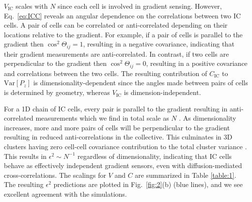 $V_\text{IC}$ scales with $N$ since each cell is involved in gradient sensing. However, Eq.\ \ref{eq:ICC} %
reveals an angular dependence on the correlations between two IC cells. A pair of cells can be correlated or anti-correlated depending on their locations relative to the gradient. For example, if a pair of cells is parallel to the gradient then
$\cos^2\Theta_{ij} = 1$,
resulting in a negative covariance, indicating that their gradient measurements are anti-correlated. In contrast, if two cells are perpendicular to the gradient then
$\cos^2\Theta_{ij} = 0$,
resulting in a positive covariance and correlations between the two cells. The resulting contribution of $C_\text{IC}$ to $\text{Var}[P_z]$ is dimensionality-dependent since the angles made between pairs of cells is determined by geometry, whereas $V_\text{IC}$ is dimension-independent.

For a 1D chain of IC cells, every pair is parallel to the gradient resulting in anti-correlated measurements which we find in total scale as $N$ \cite{supinfo}. As dimensionality increases, more and more pairs of cells will be perpendicular to the gradient resulting in reduced anti-correlations in the collective. This culminates in 3D clusters having zero cell-cell covariance contribution to the total cluster variance \cite{supinfo}. This results in $\epsilon^2 \sim N^{-1}$ regardless of dimensionality, indicating that IC cells behave as effectively independent gradient sensors, even with diffusion-mediated cross-correlations. The scalings for $V$ and $C$ are summarized in Table \ref{table:1}. The resulting $\epsilon^2$ predictions are plotted in Fig.\ \ref{fig:2}(b) (blue lines), and we see excellent agreement with the simulations.


